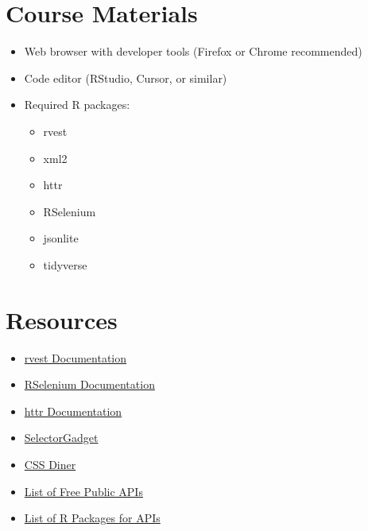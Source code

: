 \documentclass[12pt]{article}
\begin{document}
\newpage
\section*{Course Materials}
\begin{itemize}
    \item Web browser with developer tools (Firefox or Chrome recommended)
    \item Code editor (RStudio, Cursor, or similar)
    \item Required R packages:
    \begin{itemize}
        \item rvest
        \item xml2
        \item httr
        \item RSelenium
        \item jsonlite
        \item tidyverse
    \end{itemize}
\end{itemize}

\section*{Resources}
\begin{itemize}
    \item \href{https://rvest.tidyverse.org/}{rvest Documentation}
    \item \href{https://cran.r-project.org/web/packages/RSelenium/RSelenium.pdf}{RSelenium Documentation}
    \item \href{https://httr.r-lib.org/}{httr Documentation}
    \item \href{https://selectorgadget.com}{SelectorGadget}
    \item \href{https://flukeout.github.io/}{CSS Diner}
    \item \href{https://github.com/public-apis/public-apis}{List of Free Public APIs}
    \item \href{https://github.com/zhiiiyang/fc19995f7e350f3c7fb940757f6213cf#file-apis-md}{List of R Packages for APIs}
\end{itemize}
\end{document}
